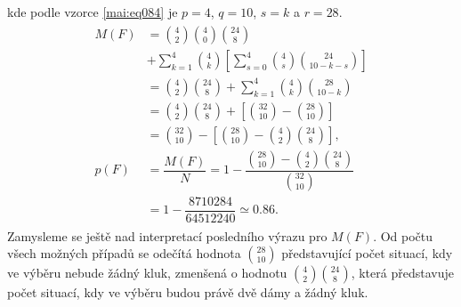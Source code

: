 \begin{mdframed}[style=mdexam]
\begin{example}
\begin{gather*}
      \end{gather*}
      kde podle vzorce \ref{mai:eq084} je \(p=4\), \(q=10\), \(s=k\) a \(r=28\).   
      \begin{gather*} 
      \begin{align*}
        M(F)&= \binom{4}{2}\binom{4}{0}\binom{24}{8}                                             \\
            &+ \sum^{4}_{k=1}\binom{4}{k}
               \left[\sum^{4}_{s=0}\binom{4}{s}\binom{24}{10 - k - s}\right]                     \\
            &= \binom{4}{2}\binom{24}{8} + \sum^{4}_{k=1}\binom{4}{k}\binom{28}{10 - k}          \\
            &= \binom{ 4}{2}\binom{24}{8} + \left[\binom{32}{10} - \binom{28}{10}\right]         \\
            &= \binom{32}{10} - \left[\binom{28}{10} - \binom{4}{2}\binom{24}{8}\right],         \\
        p(F)&= \dfrac{M(F)}{N}=1-\dfrac{\binom{28}{10}-\binom{4}{2}\binom{24}{8}}{\binom{32}{10}}\\
            &= 1 - \dfrac{\num{8710284}}{\num{64512240}} \simeq \num{0.86}.
      \end{align*}
      \end{gather*}  
      Zamysleme se ještě nad interpretací posledního výrazu pro \(M(F)\). Od počtu všech možných
      případů se odečítá hodnota \(\binom{28}{10}\) představující počet situací, kdy ve výběru
      nebude žádný kluk, zmenšená o hodnotu \(\binom{4}{2}\binom{24}{8}\), která představuje počet
      situací, kdy ve výběru budou právě dvě dámy a žádný kluk.
  \end{example}
\end{mdframed}  